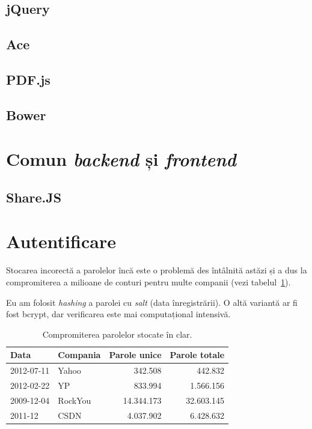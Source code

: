 \documentclass[a4wide,12pt]{report}
\newcommand{\eng}[1]{\emph{#1}} %
\begin{document}
\subsection{jQuery}

\subsection{Ace}

\subsection{PDF.js}

\subsection{Bower}

\section{Comun \eng{backend} și \eng{frontend}}

\subsection{Share.JS}

\section{Autentificare}

Stocarea incorectă a parolelor încă este o problemă des întâlnită astăzi și a
dus la compromiterea a milioane de conturi pentru multe companii (vezi
tabelul~\ref{parole}).

Eu am folosit \eng{hashing} a parolei cu \eng{salt} (data înregistrării). O altă
variantă ar fi fost bcrypt, dar verificarea este mai computațional intensivă.

\begin{table}[hb]
\begin{center}
\begin{tabular}{l l r r}
Data & Compania & Parole unice & Parole totale \\
\hline
2012-07-11 & Yahoo & 342.508 & 442.832 \\
2012-02-22 & YP & 833.994 & 1.566.156 \\
2009-12-04 & RockYou & 14.344.173 & 32.603.145 \\
2011-12 & CSDN & 4.037.902 & 6.428.632 \\
\end{tabular}
\end{center}
\caption{Compromiterea parolelor stocate în clar\cite{passleak}.}
\label{parole}
\end{table}
\end{document}
